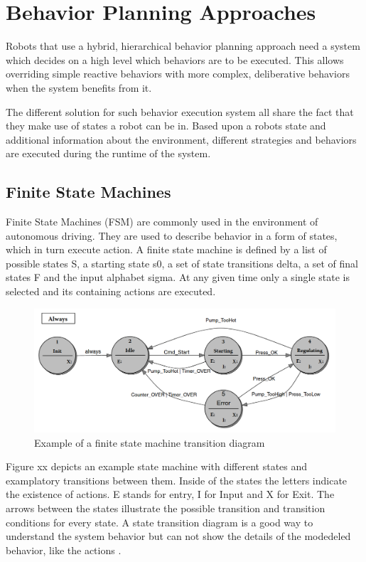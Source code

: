 \section{Behavior Planning Approaches}

Robots that use a hybrid, hierarchical behavior planning approach need a system which decides on a high level which behaviors are to be executed. This allows overriding simple reactive behaviors with more complex, deliberative behaviors when the system benefits from it. 

The different solution for such behavior execution system all share the fact that they make use of states a robot can be in. Based upon a robots state and additional information about the environment, different strategies and behaviors are executed during the runtime of the system. 
 

\subsection{Finite State Machines}

Finite State Machines (FSM) are commonly used in the environment of autonomous driving. They are used to describe behavior in a form of states, which in turn execute action. A finite state machine is defined by a list of possible states S, a starting state s0, a set of state transitions delta, a set of final states F and the input alphabet sigma. At any given time only a single state is selected and its containing actions are executed. \\

\begin{figure}
	\includegraphics[width=1.0\textwidth]{images/fsm.png} 
	\caption{Example of a finite state machine transition diagram \cite{wagner2006} }
\end{figure}

Figure xx depicts an example state machine with different states and examplatory transitions between them. Inside of the states the letters indicate the existence of actions.  E stands for entry, I for Input and X for Exit. The arrows between the states illustrate the possible transition and transition conditions for every state. A state transition diagram is a good way to understand the system behavior but can not show the details of the modedeled behavior, like the actions \cite{wagner2006}. \\

